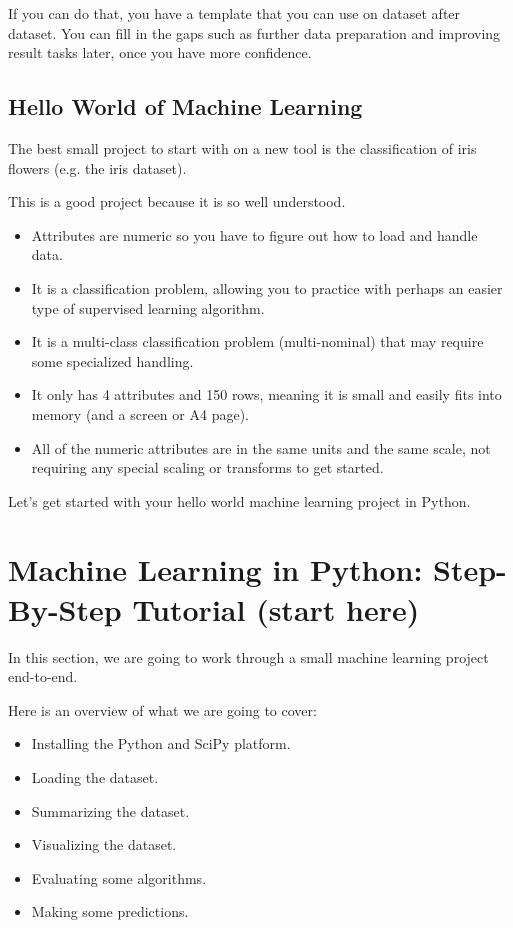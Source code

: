 If you can do that, you have a template that you can use on dataset after dataset. You can fill in the gaps such as further data preparation and improving result tasks later, once you have more confidence.
    
\subsection{Hello World of Machine Learning}

The best small project to start with on a new tool is the classification of iris flowers (e.g. the iris dataset).
    
This is a good project because it is so well understood.

\begin{itemize}
  \item Attributes are numeric so you have to figure out how to load and handle data.
  \item It is a classification problem, allowing you to practice with perhaps an easier type of supervised learning algorithm.
  \item It is a multi-class classification problem (multi-nominal) that may require some specialized handling.
  \item It only has 4 attributes and 150 rows, meaning it is small and easily fits into memory (and a screen or A4 page).
  \item All of the numeric attributes are in the same units and the same scale, not requiring any special scaling or transforms to get started.
\end{itemize}    

Let's get started with your hello world machine learning project in Python.
    
    
\section{Machine Learning in Python: Step-By-Step Tutorial (start here)}

In this section, we are going to work through a small machine learning project end-to-end.
    
Here is an overview of what we are going to cover:

\begin{itemize}
  \item Installing the Python and SciPy platform.
  \item Loading the dataset.
  \item Summarizing the dataset.
  \item Visualizing the dataset.
  \item Evaluating some algorithms.
  \item Making some predictions.
\end{itemize}    

